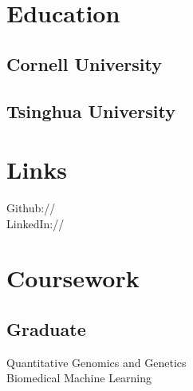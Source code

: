 \documentclass[]{deedy-resume-openfont}
\begin{document}
%
%


%
%

\begin{minipage}[t]{0.33\textwidth} 


\section{Education} 

\subsection{Cornell University}
\sectionsep

\subsection{Tsinghua University}
\sectionsep


\section{Links} 
Github:// \href{https://github.com/OXPHOS}{} \\
LinkedIn://  \href{https://www.linkedin.com/in/pandeng16}{} \\
\sectionsep


\section{Coursework}
\subsection{Graduate}
Quantitative Genomics and Genetics \\
Biomedical Machine Learning \\
\sectionsep


\end{minipage}
\end{document}

